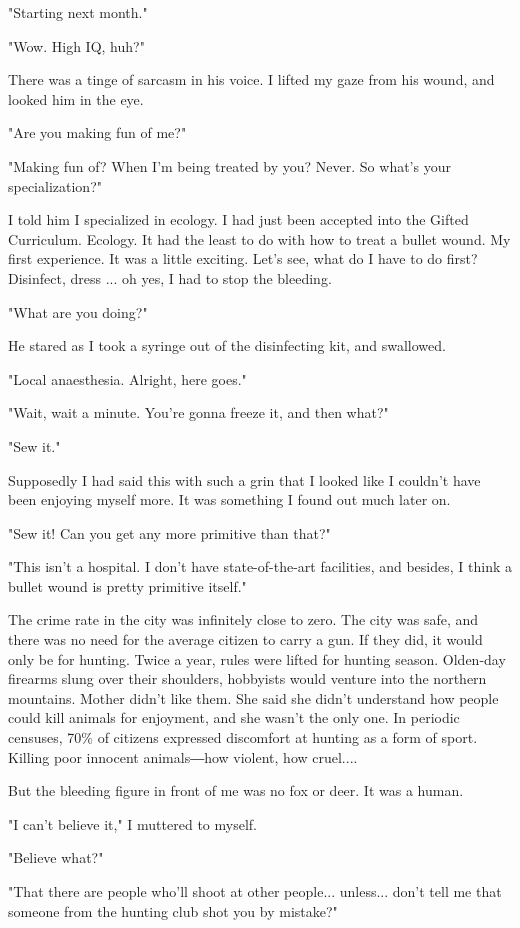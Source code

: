 "Starting next month."

"Wow. High IQ, huh?"

There was a tinge of sarcasm in his voice. I lifted my gaze from his
wound, and looked him in the eye.

"Are you making fun of me?"

"Making fun of? When I'm being treated by you? Never. So what's your
specialization?"

I told him I specialized in ecology. I had just been accepted into the
Gifted Curriculum. Ecology. It had the least to do with how to treat a
bullet wound. My first experience. It was a little exciting. Let's see,
what do I have to do first? Disinfect, dress ... oh yes, I had to stop
the bleeding.

"What are you doing?"

He stared as I took a syringe out of the disinfecting kit, and
swallowed.

"Local anaesthesia. Alright, here goes."

"Wait, wait a minute. You're gonna freeze it, and then what?"

"Sew it."

Supposedly I had said this with such a grin that I looked like I
couldn't have been enjoying myself more. It was something I found out
much later on.

"Sew it! Can you get any more primitive than that?"

"This isn't a hospital. I don't have state-of-the-art facilities, and
besides, I think a bullet wound is pretty primitive itself."

The crime rate in the city was infinitely close to zero. The city was
safe, and there was no need for the average citizen to carry a gun. If
they did, it would only be for hunting. Twice a year, rules were lifted
for hunting season. Olden-day firearms slung over their shoulders,
hobbyists would venture into the northern mountains. Mother didn't like
them. She said she didn't understand how people could kill animals for
enjoyment, and she wasn't the only one. In periodic censuses, 70\% of
citizens expressed discomfort at hunting as a form of sport. Killing
poor innocent animals―how violent, how cruel....

But the bleeding figure in front of me was no fox or deer. It was a
human.

"I can't believe it," I muttered to myself.

"Believe what?"

"That there are people who'll shoot at other people... unless... don't
tell me that someone from the hunting club shot you by mistake?"

